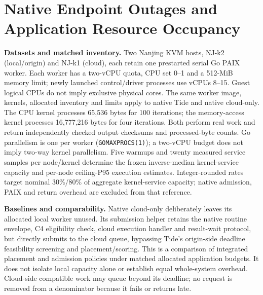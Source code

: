 \section{Native Endpoint Outages and Application Resource Occupancy}
\label{sec:supp-native-ru}
\noindent\textbf{Datasets and matched inventory.}
Two Nanjing KVM hosts, NJ-k2 (local/origin) and NJ-k1 (cloud), each retain one prestarted serial Go PAIX worker. Each worker has a two-vCPU quota, CPU set 0--1 and a 512-MiB memory limit; newly launched control/driver processes use vCPUs 8--15. Guest logical CPUs do not imply exclusive physical cores. The same worker image, kernels, allocated inventory and limits apply to native Tide and native cloud-only. The CPU kernel processes 65,536 bytes for 100 iterations; the memory-access kernel processes 16,777,216 bytes for four iterations. Both perform real work and return independently checked output checksums and processed-byte counts. Go parallelism is one per worker (\texttt{GOMAXPROCS(1)}); a two-vCPU budget does not imply two-way kernel parallelism. Five warmups and twenty measured service samples per node/kernel determine the frozen inverse-median kernel-service capacity and per-node ceiling-P95 execution estimates. Integer-rounded rates target nominal 30\%/80\% of aggregate kernel-service capacity; native admission, PAIX and return overhead are excluded from that reference.

\noindent\textbf{Baselines and comparability.}
Native cloud-only deliberately leaves its allocated local worker unused. Its submission helper retains the native routine envelope, C4 eligibility check, cloud execution handler and result-wait protocol, but directly submits to the cloud queue, bypassing Tide's origin-side deadline feasibility screening and placement/scoring. This is a comparison of integrated placement and admission policies under matched allocated application budgets. It does not isolate local capacity alone or establish equal whole-system overhead. Cloud-side compatible work may queue beyond its deadline; no request is removed from a denominator because it fails or returns late.

